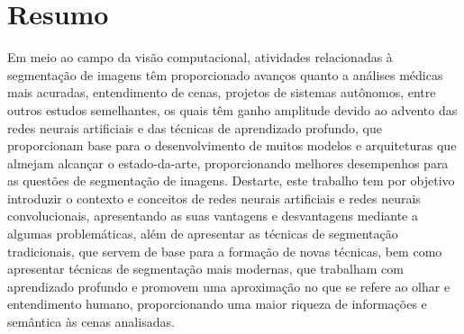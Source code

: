 \section*{Resumo}

Em meio ao campo da visão computacional, atividades relacionadas à segmentação de imagens têm proporcionado avanços quanto a análises médicas mais acuradas, entendimento de cenas, projetos de sistemas autônomos, entre outros estudos semelhantes, os quais têm ganho amplitude devido ao advento das redes neurais artificiais e das técnicas de aprendizado profundo, que proporcionam base para o desenvolvimento de muitos modelos e arquiteturas que almejam alcançar o estado-da-arte, proporcionando melhores desempenhos para as questões de segmentação de imagens.
Destarte, este trabalho tem por objetivo introduzir o contexto e conceitos de redes neurais artificiais e redes neurais convolucionais, apresentando as suas vantagens e desvantagens mediante a algumas problemáticas, além de apresentar as técnicas de segmentação tradicionais, que servem de base para a formação de novas técnicas, bem como apresentar técnicas de segmentação mais modernas, que trabalham com aprendizado profundo e promovem uma aproximação no que se refere ao olhar e entendimento humano, proporcionando uma maior riqueza de informações e semântica às cenas analisadas. 
